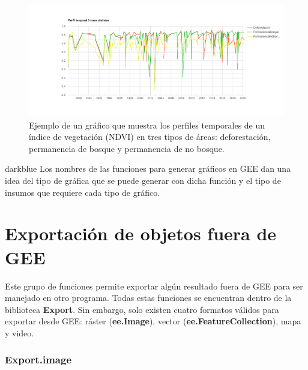 \documentclass[
  12pt,
  letterpaper,
  twoside]{book}
\newcommand\boldpurple[1]{\textcolor{darkpurple}{\textbf{#1}}}
\begin{document}
\begin{figure}[H]

{\centering \includegraphics[width=0.95\linewidth]{Img/chartEjemplo} 

}

\caption{Ejemplo de un gráfico que muestra los perfiles temporales de un índice de vegetación (NDVI) en tres tipos de áreas: deforestación, permanencia de bosque y permanencia de no bosque.}\label{fig:f34}
\end{figure}

\begin{bluebox2}

\begin{awesomeblock}{5pt}{\faLightbulb}{darkblue}
Los nombres de las funciones para generar gráficos en GEE dan una idea del tipo de gráfica que se puede generar con dicha función y el tipo de insumos que requiere cada tipo de gráfico.

\end{awesomeblock}

\end{bluebox2}

\hypertarget{exportaciuxf3n-de-objetos-fuera-de-gee}{%
\section{Exportación de objetos fuera de GEE}\label{exportaciuxf3n-de-objetos-fuera-de-gee}}

Este grupo de funciones permite exportar algún resultado fuera de GEE para ser manejado en otro programa. Todas estas funciones se encuentran dentro de la biblioteca \boldpurple{Export}. Sin embargo, solo existen cuatro formatos válidos para exportar desde GEE: ráster (\boldpurple{ee.Image}), vector (\boldpurple{ee.FeatureCollection}), mapa y video.

\hypertarget{export.image}{%
\subsubsection*{Export.image}\label{export.image}}
\end{document}
